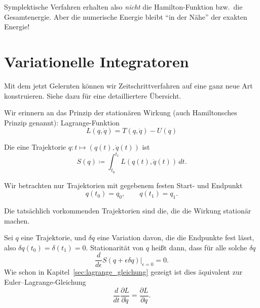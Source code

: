 Symplektische Verfahren erhalten also \emph{nicht} die Hamilton-Funktion bzw.\ die Gesamtenergie. Aber die numerische Energie bleibt \enquote{in der Nähe} der exakten Energie!


\section{Variationelle Integratoren}

Mit dem jetzt Gelernten können wir Zeitschrittverfahren auf eine ganz neue Art konstruieren.
Siehe dazu \cite{marsden_west:2001} für eine detailliertere Übersicht.

Wir erinnern an das Prinzip der stationären Wirkung (auch Hamiltonsches Prinzip genannt): 
Lagrange-Funktion
\begin{equation*}
	L(q,\dot q) = T(q,\dot q) - U(q)
\end{equation*}

\begin{definition}
	Die  eine Trajektorie $q\colon t\mapsto (q(t),\dot q(t))$ ist
	\begin{equation*}
		S(q)\coloneqq \int_{t_0}^{t_1} L(q(t),\dot q(t))\,dt.
	\end{equation*}
\end{definition}

Wir betrachten nur Trajektorien mit gegebenem festen Start- und Endpunkt
\begin{equation*}
	q(t_0) = q_0,\qquad q(t_1) = q_1.
\end{equation*}

\begin{definition}
	Die tatsächlich vorkommenden Trajektorien sind die, die die Wirkung stationär machen.
\end{definition}

Sei $q$ eine Trajektorie, und $\delta q$ eine Variation davon, die die Endpunkte fest lässt, also $\delta q(t_0)=\delta(t_1) = 0$.
Stationarität von $q$ heißt dann, dass für alle solche $\delta q$
\begin{equation*}
	\frac{d}{d\epsilon} S(q+\epsilon\delta q)\big\vert_{\epsilon=0} = 0.
\end{equation*}
Wie schon in Kapitel~\ref{sec:lagrange_gleichung} gezeigt ist dies äquivalent zur Euler--Lagrange-Gleichung
\begin{equation*}
	\frac{d}{dt}\frac{\partial L}{\partial \dot q} = \frac{\partial L}{\partial q}.
\end{equation*}



